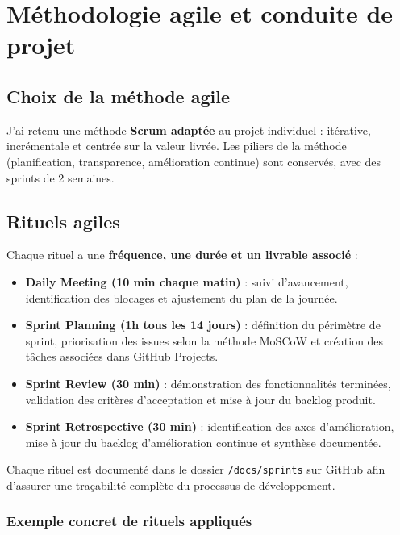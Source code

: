 \section{Méthodologie agile et conduite de projet}

\subsection{Choix de la méthode agile}

J’ai retenu une méthode \textbf{Scrum adaptée} au projet individuel : itérative, incrémentale et centrée sur la valeur livrée.  
Les piliers de la méthode (planification, transparence, amélioration continue) sont conservés, avec des sprints de 2 semaines.

\subsection{Rituels agiles}

Chaque rituel a une \textbf{fréquence, une durée et un livrable associé} :

\begin{itemize}
    \item \textbf{Daily Meeting (10 min chaque matin)} : suivi d’avancement, identification des blocages et ajustement du plan de la journée.
    \item \textbf{Sprint Planning (1h tous les 14 jours)} : définition du périmètre de sprint, priorisation des issues selon la méthode MoSCoW et création des tâches associées dans GitHub Projects.
    \item \textbf{Sprint Review (30 min)} : démonstration des fonctionnalités terminées, validation des critères d’acceptation et mise à jour du backlog produit.
    \item \textbf{Sprint Retrospective (30 min)} : identification des axes d’amélioration, mise à jour du backlog d’amélioration continue et synthèse documentée.
\end{itemize}

Chaque rituel est documenté dans le dossier \texttt{/docs/sprints} sur GitHub afin d’assurer une traçabilité complète du processus de développement.

\subsubsection{Exemple concret de rituels appliqués}

